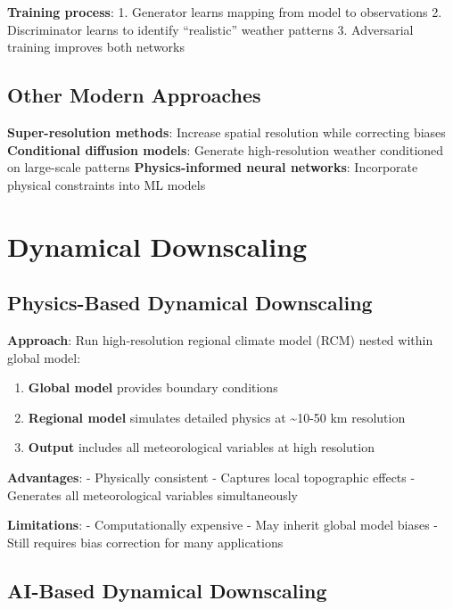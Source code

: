 \documentclass[
  letterpaper,
  DIV=11,
  numbers=noendperiod]{scrreprt}
\providecommand{\tightlist}{%
  \setlength{\itemsep}{0pt}\setlength{\parskip}{0pt}}
\begin{document}
\textbf{Training process}: 1. Generator learns mapping from model to
observations 2. Discriminator learns to identify ``realistic'' weather
patterns 3. Adversarial training improves both networks

\subsection{Other Modern Approaches}\label{other-modern-approaches}

\textbf{Super-resolution methods}: Increase spatial resolution while
correcting biases \textbf{Conditional diffusion models}: Generate
high-resolution weather conditioned on large-scale patterns
\textbf{Physics-informed neural networks}: Incorporate physical
constraints into ML models

\section{Dynamical Downscaling}\label{dynamical-downscaling}

\subsection{Physics-Based Dynamical
Downscaling}\label{physics-based-dynamical-downscaling}

\textbf{Approach}: Run high-resolution regional climate model (RCM)
nested within global model:

\begin{enumerate}
\def\labelenumi{\arabic{enumi}.}
\tightlist
\item
  \textbf{Global model} provides boundary conditions
\item
  \textbf{Regional model} simulates detailed physics at
  \textasciitilde10-50 km resolution
\item
  \textbf{Output} includes all meteorological variables at high
  resolution
\end{enumerate}

\textbf{Advantages}: - Physically consistent - Captures local
topographic effects - Generates all meteorological variables
simultaneously

\textbf{Limitations}: - Computationally expensive - May inherit global
model biases - Still requires bias correction for many applications

\subsection{AI-Based Dynamical
Downscaling}\label{ai-based-dynamical-downscaling}
\end{document}
